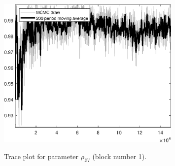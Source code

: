 \begin{figure}[H]
\centering
  \includegraphics[width=0.8\textwidth]{BRS_sectoral_KK/graphs/TracePlot_rho_ZI_blck_1}\\
    \caption{Trace plot for parameter ${\rho_{ZI}}$ (block number 1).}
\end{figure}
